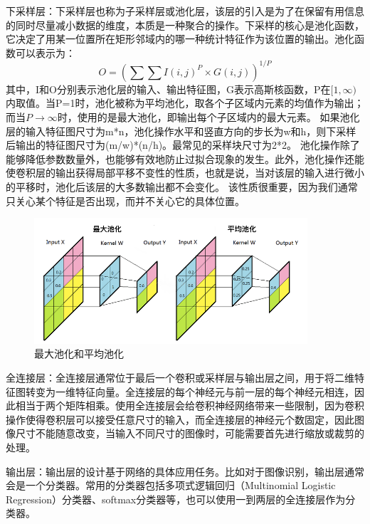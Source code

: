 下采样层：下采样层也称为子采样层或池化层，该层的引入是为了在保留有用信息的同时尽量减小数据的维度，本质是一种聚合的操作。下采样的核心是池化函数，它决定了用某一位置所在矩形邻域内的哪一种统计特征作为该位置的输出。池化函数可以表示为：
\begin{equation}
O = (\sum \sum I(i,j)^P \times G(i,j))^{1/P}
\end{equation}
其中，I和O分别表示池化层的输入、输出特征图，G表示高斯核函数，P在$[1, \infty)$内取值。当P=1时，池化被称为平均池化，取各个子区域内元素的均值作为输出；而当$P\rightarrow \infty$时，使用的是最大池化，即输出每个子区域内的最大元素。
如果池化层的输入特征图尺寸为m*n，池化操作水平和竖直方向的步长为w和h，则下采样后输出的特征图尺寸为(m/w)*(n/h)。最常见的采样块尺寸为2*2。
池化操作除了能够降低参数数量外，也能够有效地防止过拟合现象的发生。此外，池化操作还能使卷积层的输出获得局部平移不变性的性质，也就是说，当对该层的输入进行微小的平移时，池化后该层的大多数输出都不会变化。
该性质很重要，因为我们通常只关心某个特征是否出现，而并不关心它的具体位置。

\begin{figure}[htb] %
	\centering
	\includegraphics[width=4in]{figures/3_1_最大池化和平均池化}
	\caption{最大池化和平均池化} \label{fig:3_1_最大池化和平均池化}
\end{figure}

全连接层：全连接层通常位于最后一个卷积或采样层与输出层之间，用于将二维特征图转变为一维特征向量。全连接层的每个神经元与前一层的每个神经元相连，因此相当于两个矩阵相乘。使用全连接层会给卷积神经网络带来一些限制，因为卷积操作使得卷积层可以接受任意尺寸的输入，而全连接层的神经元个数固定，因此图像尺寸不能随意改变，当输入不同尺寸的图像时，可能需要首先进行缩放或裁剪的处理。

输出层：输出层的设计基于网络的具体应用任务。比如对于图像识别，输出层通常会是一个分类器。常用的分类器包括多项式逻辑回归（Multinomial Logistic Regression）分类器、softmax分类器等，也可以使用一到两层的全连接层作为分类器。

